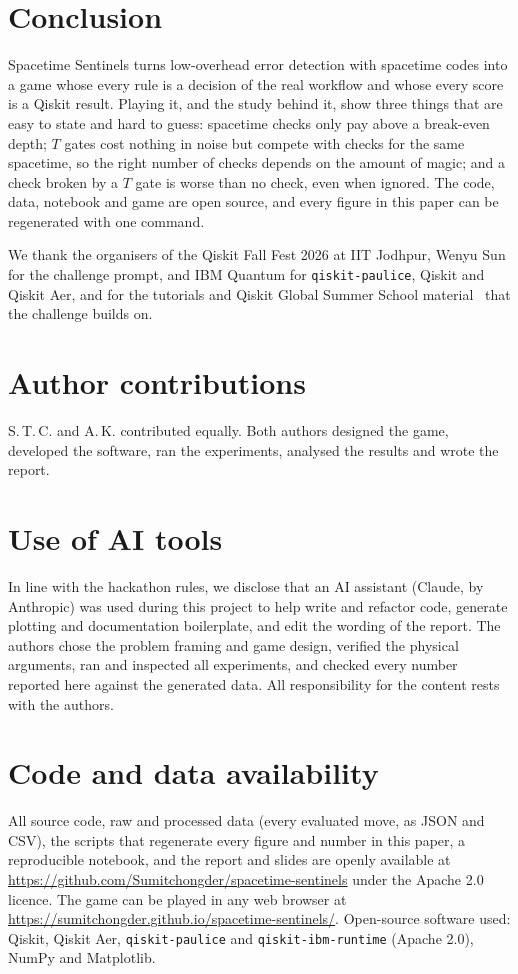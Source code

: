 \section{Conclusion}
\label{sec:conclusion}
Spacetime Sentinels turns low-overhead error detection with spacetime codes into a game whose every rule is a decision of the real workflow and whose every score is a Qiskit result. Playing it, and the study behind it, show three things that are easy to state and hard to guess: spacetime checks only pay above a break-even depth; $T$ gates cost nothing in noise but compete with checks for the same spacetime, so the right number of checks depends on the amount of magic; and a check broken by a $T$ gate is worse than no check, even when ignored. The code, data, notebook and game are open source, and every figure in this paper can be regenerated with one command.

\begin{acknowledgments}
We thank the organisers of the Qiskit Fall Fest 2026 at IIT Jodhpur, Wenyu Sun for the challenge prompt, and IBM Quantum for \texttt{qiskit-paulice}, Qiskit and Qiskit Aer, and for the tutorials and Qiskit Global Summer School material~\cite{qgss2025lab4,qgss2026lab3} that the challenge builds on.
\end{acknowledgments}

\section*{Author contributions}
S.\,T.\,C. and A.\,K. contributed equally. Both authors designed the game, developed the software, ran the experiments, analysed the results and wrote the report.

\section*{Use of AI tools}
In line with the hackathon rules, we disclose that an AI assistant (Claude, by Anthropic) was used during this project to help write and refactor code, generate plotting and documentation boilerplate, and edit the wording of the report. The authors chose the problem framing and game design, verified the physical arguments, ran and inspected all experiments, and checked every number reported here against the generated data. All responsibility for the content rests with the authors.

\section*{Code and data availability}
All source code, raw and processed data (every evaluated move, as JSON and CSV), the scripts that regenerate every figure and number in this paper, a reproducible notebook, and the report and slides are openly available at \url{https://github.com/Sumitchongder/spacetime-sentinels} under the Apache 2.0 licence. The game can be played in any web browser at \url{https://sumitchongder.github.io/spacetime-sentinels/}. Open-source software used: Qiskit, Qiskit Aer, \texttt{qiskit-paulice} and \texttt{qiskit-ibm-runtime} (Apache 2.0), NumPy and Matplotlib.
